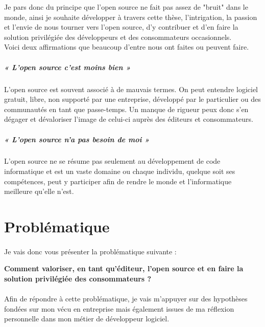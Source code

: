 		Je pars donc du principe que l'open source ne fait pas assez de "bruit" dans le monde, ainsi je souhaite développer à travers cette thèse, l'intrigation, la passion et l'envie de nous tourner vers l'open source, d'y contribuer et d'en faire la solution privilégiée des développeurs et des consommateurs occasionnels.\\

		Voici deux affirmations que beaucoup d'entre nous ont faites ou peuvent faire.
			
			\subparagraph{« L'open source c'est moins bien »\\}

			L'open source est souvent associé à de mauvais termes. On peut entendre logiciel gratuit, libre, non supporté par une entreprise, développé par le particulier ou des communautés en tant que passe-temps. Un manque de rigueur peux donc s'en dégager et dévaloriser l'image de celui-ci auprès des éditeurs et consommateurs.

			\subparagraph{« L'open source n'a pas besoin de moi »\\}

			L'open source ne se résume pas seulement au développement de code informatique et est un vaste domaine ou chaque individu, quelque soit ses compétences, peut y participer afin de rendre le monde et l'informatique meilleure qu'elle n'est.

	\section{Problématique}
		\paragraph*{}
		Je vais donc vous présenter la problématique suivante :
		\begin{center}
			\begin{displayquote}
				\textbf{Comment valoriser, en tant qu'éditeur, l'open source et en faire la solution privilégiée des consommateurs ?}
			\end{displayquote}
		\end{center}

		\paragraph*{}
		Afin de répondre à cette problématique, je vais m'appuyer sur des hypothèses fondées sur mon vécu en entreprise mais également issues de ma réflexion personnelle dans mon métier de développeur logiciel.

